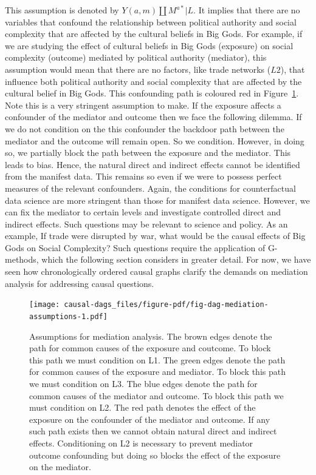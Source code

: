 \documentclass[
  singlecolumn]{report}
\begin{document}
This assumption is denoted by \(Y(a,m) \coprod M^{a*} | L\). It implies
that there are no variables that confound the relationship between
political authority and social complexity that are affected by the
cultural beliefs in Big Gods. For example, if we are studying the effect
of cultural beliefs in Big Gods (exposure) on social complexity
(outcome) mediated by political authority (mediator), this assumption
would mean that there are no factors, like trade networks (\(L2\)), that
influence both political authority and social complexity that are
affected by the cultural belief in Big Gods. This confounding path is
coloured red in Figure~\ref{fig-dag-mediation-assumptions}. Note this is
a very stringent assumption to make. If the exposure affects a
confounder of the mediator and outcome then we face the following
dilemma. If we do not condition on the this confounder the backdoor path
between the mediator and the outcome will remain open. So we condition.
However, in doing so, we partially block the path between the exposure
and the mediator. This leads to bias. Hence, the natural direct and
indirect effects cannot be identified from the manifest data. This
remains so even if we were to possess perfect measures of the relevant
confounders. Again, the conditions for counterfactual data science are
more stringent than those for manifest data science. However, we can fix
the mediator to certain levels and investigate controlled direct and
indirect effects. Such questions may be relevant to science and policy.
As an example, If trade were disrupted by war, what would be the causal
effects of Big Gods on Social Complexity? Such questions require the
application of G-methods, which the following section considers in
greater detail. For now, we have seen how chronologically ordered causal
graphs clarify the demands on mediation analysis for addressing causal
questions.

\begin{figure}

{\centering \texttt{[image: causal-dags\_files/figure-pdf/fig-dag-mediation-assumptions-1.pdf]}

}

\caption{\label{fig-dag-mediation-assumptions}Assumptions for mediation
analysis. The brown edges denote the path for common causes of the
exposure and coutcome. To block this path we must condition on L1. The
green edges denote the path for common causes of the exposure and
mediator. To block this path we must condition on L3. The blue edges
denote the path for common causes of the mediator and outcome. To block
this path we must condition on L2. The red path denotes the effect of
the exposure on the confounder of the mediator and outcome. If any such
path exists then we cannot obtain natural direct and indirect effects.
Conditioning on L2 is necessary to prevent mediator outcome confounding
but doing so blocks the effect of the exposure on the mediator.}

\end{figure}
\end{document}
